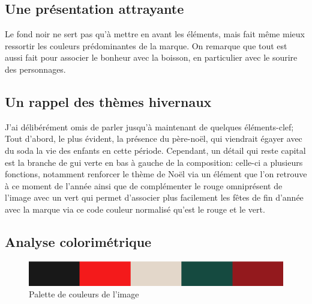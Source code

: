 \subsection{Une présentation attrayante}

Le fond noir ne sert pas qu'à mettre en avant les éléments, mais fait même mieux ressortir les couleurs prédominantes de la marque. On remarque que tout est aussi fait pour associer le bonheur avec la boisson, en particulier avec le sourire des personnages.

\subsection{Un rappel des thèmes hivernaux}

J'ai délibérément omis de parler jusqu'à maintenant de quelques éléments-clef; Tout d'abord, le plus évident, la présence du père-noël, qui viendrait égayer avec du soda la vie des enfants en cette période. Cependant, un détail qui reste capital est la branche de gui verte en bas à gauche de la composition: celle-ci a plusieurs fonctions, notamment renforcer le thème de Noël via un élément que l'on retrouve à ce moment de l'année ainsi que de complémenter le rouge omniprésent de l'image avec un vert qui permet d'associer plus facilement les fêtes de fin d'année avec la marque via ce code couleur normalisé qu'est le rouge et le vert.

\subsection{Analyse colorimétrique}

\begin{figure}[th]
\centering
\includegraphics[width=130mm]{medias/palette}
\decoRule
\caption{Palette de couleurs de l'image}
\end{figure}

